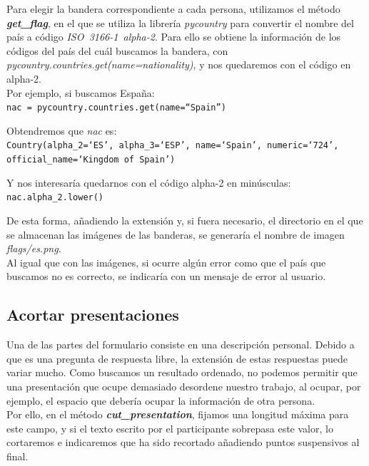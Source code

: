 \documentclass[a4paper, 12pt]{book}
\begin{document}
Para elegir la bandera correspondiente a cada persona, utilizamos el método \textbf{\textit{get\_flag}}, en el que se utiliza la librería \textit{pycountry} para convertir el nombre del país a código \mbox{\textit{ISO 3166-1 alpha-2}}. Para ello se obtiene la información de los códigos del país del cuál buscamos la bandera, con \textit{pycountry.countries.get(name=nationality)}, y nos quedaremos con el código en alpha-2.\\

Por ejemplo, si buscamos España:\\
\texttt{nac = pycountry.countries.get(name=``Spain'')}

Obtendremos que \textit{nac} es:\\
\texttt{Country(alpha\_2=`ES', alpha\_3=`ESP', name=`Spain', numeric=`724', official\_name=`Kingdom of Spain')}

Y nos interesaría quedarnos con el código alpha-2 en minúsculas:\\
\texttt{nac.alpha\_2.lower()}

De esta forma, añadiendo la extensión y, si fuera necesario, el directorio en el que se almacenan las imágenes de las banderas, se generaría el nombre de imagen \textit{flags/es.png}.\\

Al igual que con las imágenes, si ocurre algún error como que el país que buscamos no es correcto, se indicaría con un mensaje de error al usuario.

\subsection{Acortar presentaciones}
\label{subsec:presentacion}
Una de las partes del formulario consiste en una descripción personal. Debido a que es una pregunta de respuesta libre, la extensión de estas respuestas puede variar mucho. Como buscamos un resultado ordenado, no podemos permitir que una presentación que ocupe demasiado desordene nuestro trabajo, al ocupar, por ejemplo, el espacio que debería ocupar la información de otra persona.\\

Por ello, en el método \textbf{\textit{cut\_presentation}}, fijamos una longitud máxima para este campo, y si el texto escrito por el participante sobrepasa este valor, lo cortaremos e indicaremos que ha sido recortado añadiendo puntos suspensivos al final.
\end{document}
